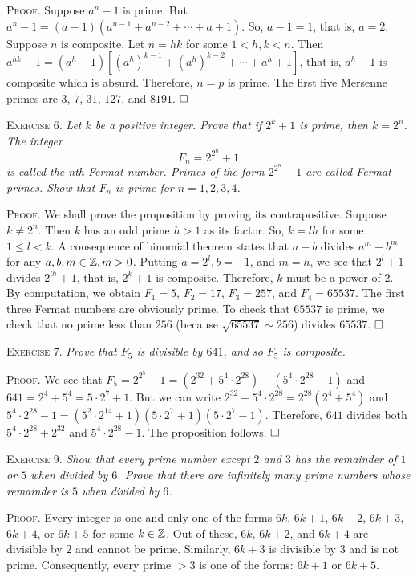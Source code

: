 \documentclass[11pt, leqno]{article}
\newcommand{\done}{\ensuremath{\hfill\square}}
\begin{document}
\textsc{Proof}. Suppose $a^n-1$ is prime. But $a^n-1 = (a-1)(a^{n-1} + a^{n-2} + \cdots + a + 1)$. So, $a-1 = 1$, that is, $a=2$. Suppose $n$ is composite. Let $n = hk$ for some $1 < h, k < n$. Then $a^{hk}-1 = (a^h-1)[(a^h)^{k-1} + (a^h)^{k-2} + \cdots + a^h + 1]$, that is, $a^h-1$ is composite which is absurd. Therefore, $n = p$ is prime. The first five Mersenne primes are $3$, $7$, $31$, $127$, and $8191$. \done

\textsc{Exercise 6}. \emph{Let $k$ be a positive integer. Prove that if $2^k+1$ is prime, then $k= 2^n$. The integer 
\begin{displaymath}
F_n = 2^{2^n} + 1
\end{displaymath}
is called the nth Fermat number. Primes of the form $2^{2^n}+1$ are called Fermat primes. Show that $F_n$ is prime for $n=1,2,3,4$.}

\textsc{Proof}. We shall prove the proposition by proving its contrapositive. Suppose $k \ne 2^n$. Then $k$ has an odd prime $h>1$ as its factor. So, $k = lh$ for some $1\leq l < k$. A consequence of binomial theorem states that $a-b$ divides $a^m-b^m$ for any $a, b, m\in\mathbb{Z}, m>0$. Putting $a = 2^l, b = -1$, and $m = h$, we see that $2^l+1$ divides $2^{lh}+1$, that is, $2^k+1$ is composite. Therefore, $k$ must be a power of $2$. By computation, we obtain $F_1 = 5$, $F_2 = 17$, $F_3 = 257$, and $F_4 = 65537$. The first three Fermat numbers are obviously prime. To check that $65537$ is prime, we check that no prime less than $256$ (because $\sqrt{65537} \sim 256$) divides $65537$. \done

\textsc{Exercise 7}. \emph{Prove that $F_5$ is divisible by $641$, and so $F_5$ is composite.}

\textsc{Proof.} We see that $F_5 = 2^{2^5} - 1 = (2^{32} + 5^4\cdot 2^{28}) - (5^4\cdot 2^{28} - 1)$ and $641 = 2^4 + 5^4 = 5\cdot 2^7 + 1$. But we can write $2^{32} + 5^4\cdot 2^{28} = 2^{28}(2^4 + 5^4)$ and $5^4\cdot 2^{28} - 1 = (5^2\cdot 2^{14} + 1)(5\cdot 2^7 + 1)(5\cdot 2^7 - 1)$. Therefore, $641$ divides both $5^4\cdot 2^{28} + 2^{32}$ and $5^4\cdot 2^{28} - 1$. The proposition follows. \done

\textsc{Exercise 9}. \emph{Show that every prime number except $2$ and $3$ has the remainder of $1$ or $5$ when divided by $6$. Prove that there are infinitely many prime numbers whose remainder is $5$ when divided by $6$.}

\textsc{Proof}. Every integer is one and only one of the forms $6k$, $6k+1$, $6k+2$, $6k+3$, $6k+4$, or $6k+5$ for some $k\in\mathbb{Z}$. Out of these, $6k$, $6k+2$, and $6k+4$ are divisible by $2$ and cannot be prime. Similarly, $6k+3$ is divisible by $3$ and is not prime. Consequently, every prime $>3$ is one of the forms: $6k+1$ or $6k+5$.
\end{document}
